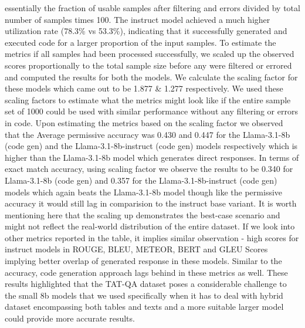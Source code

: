 \documentclass[logo,msc]{infthesis}           %
\begin{document}
essentially the fraction of usable samples after filtering and errors divided by total number of samples times 100. The instruct model achieved a much higher utilization rate (78.3\% vs 53.3\%), indicating that it successfully generated and executed code for a larger proportion of the input samples. To estimate the metrics if all samples had been processed successfully, we scaled up the observed scores proportionally to the total sample size before any were filtered or errored and computed the results for both the models. We calculate the scaling factor for these models which came out to be 1.877 \& 1.277 respectively. We used these scaling factors to estimate what the metrics might look like if the entire sample set of 1000 could be used with similar performance without any filtering or errors in code. Upon estimating the metrics based on the scaling factor we observed that the Average permissive accuracy was 0.430 and 0.447 for the Llama-3.1-8b (code gen) and the Llama-3.1-8b-instruct (code gen) models respectively which is higher than the Llama-3.1-8b model which generates direct responses. In terms of exact match accuracy, using scaling factor we observe the results to be 0.340 for Llama-3.1-8b (code gen) and 0.357 for the Llama-3.1-8b-instruct (code gen) models which again beats the Llama-3.1-8b model though like the permissive accuracy it would still lag in comparision to the instruct base variant. It is worth mentioning here that the scaling up demonstrates the best-case scenario and might not reflect the real-world distribution of the entire dataset. If we look into other metrics reported in the table, it implies similar observation - high scores for instruct models in ROUGE, BLEU, METEOR, BERT and GLEU Scores implying better overlap of generated response in these models. Similar to the accuracy, code generation approach lags behind in these metrics as well. These results highlighted that the TAT-QA dataset poses a considerable challenge to the small 8b models that we used specifically when it has to deal with hybrid dataset encompassing both tables and texts and a more suitable larger model could provide more accurate results.
\end{document}
